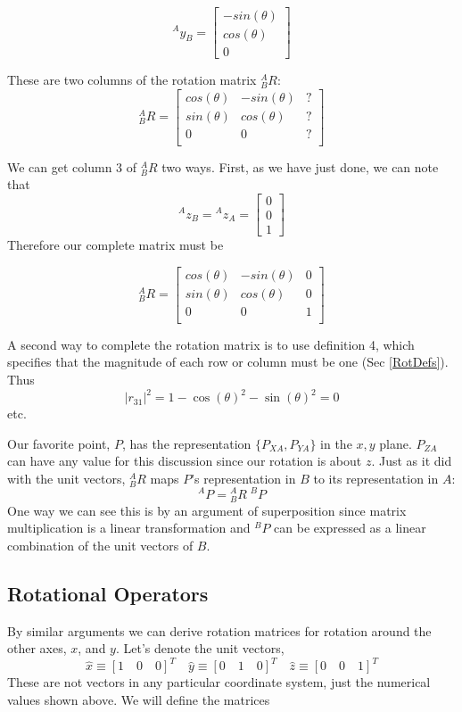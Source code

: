 \[
^Ay_B = \left [ \begin{array}{c}   -sin(\theta) \\ cos(\theta) \\ 0 \end{array} \right ]
\]

These are two columns of the rotation matrix $^A_BR$:
\[
^A_BR = \left[
\begin{array}{ccc}
cos(\theta) & -sin(\theta) & ? \\
sin(\theta) &  cos(\theta) & ? \\
0           &          0   & ? \\
\end{array}\right]
\]


We can get column 3 of $^A_BR$ two ways.  First, as we have just done, we can note that
\[
^Az_B = {^Az_A} = \left[\begin{array}{c} 0 \\ 0 \\ 1 \end{array}\right]
\]
Therefore our complete matrix must be

\[
^A_BR = \left[
\begin{array}{ccc}
cos(\theta) & -sin(\theta) & 0 \\
sin(\theta) &  cos(\theta) & 0 \\
0           &          0   & 1 \\
\end{array}\right]
\]

A second way to complete the rotation matrix is to use definition 4, which specifies that the magnitude of each row or column must be one (Sec \ref{RotDefs}).  Thus
\[
|r_{31}|^2 = 1-\cos(\theta)^2-\sin(\theta)^2 = 0
\]
etc.

Our favorite point, $P$, has the representation $\{P_{XA}, P_{YA}\}$ in the $x,y$ plane.  $P_{ZA}$ can have any value for this discussion since our rotation is about $z$.
Just as it did with the unit vectors, $^A_BR$ maps $P$'s representation in $B$ to its representation in $A$:
\[
^AP = {^A_BR} \; {^BP}
\]
One way we can see this is by an argument of superposition since matrix multiplication is a linear transformation and $^BP$ can be expressed as a linear combination of the unit vectors of $B$.


\subsection{Rotational Operators}
By similar arguments we can derive rotation matrices for rotation around the other axes, $x$, and $y$.  Let's denote the unit vectors,
\[
\hat{x} \equiv [1 \quad 0 \quad 0]^T \quad \hat{y} \equiv  [0 \quad 1 \quad 0 ]^T \quad \hat{z} \equiv [0 \quad 0 \quad 1]^T
\]
These are not vectors in any particular coordinate system, just the numerical values shown above.   We will define the matrices

